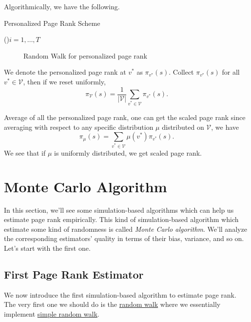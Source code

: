 Algorithmically, we have the following.

\begin{algorithm}[H]\label{algo:personalized-page-rank-scheme}
	\DontPrintSemicolon
	\caption{Personalized Page Rank Scheme}
	\BlankLine

	\For(){\(i = 1, \dots, T\)}{
	}
	\Return{}\;
\end{algorithm}
\begin{figure}[H]
	\centering
	\caption{Random Walk for personalized page rank}
	\label{fig:personalized-pagerank}
\end{figure}

We denote the personalized page rank at \(v^{\ast} \) as \(\pi_{v^{\ast}}(s)\). Collect \(\pi_{v^{\ast}}(s)\) for all \(v^{\ast}\in\mathcal{V}\), then if we reset uniformly,
\[
	\pi_{\mathcal{V}} (s) = \frac{1}{\left\vert \mathcal{V} \right\vert }\sum\limits_{v^{\ast}\in\mathcal{V}} \pi_{v^{\ast}}(s).
\]

\begin{remark}
	Average of all the personalized page rank, one can get the scaled page rank since averaging with respect to any specific distribution \(\mu\) distributed on \(\mathcal{V}\), we have
	\[
		\pi_\mu(s) = \sum\limits_{v^{\ast}\in \mathcal{V}} \mu(v^{\ast})\pi_{v^{\ast}}(s).
	\]
	We see that if \(\mu\) is uniformly distributed, we get scaled page rank.
\end{remark}

\section{Monte Carlo Algorithm}
In this section, we'll see some simulation-based algorithms which can help us estimate page rank empirically. This kind of simulation-based algorithm which estimate some kind of randomness is called \emph{Monte Carlo algorithm}. We'll analyze the corresponding estimators' quality in terms of their bias, variance, and so on. Let's start with the first one.

\subsection{First Page Rank Estimator}
We now introduce the first simulation-based algorithm to estimate page rank. The very first one we should do is the \hyperref[algo:random-walk-algorithm]{random walk} where we essentially implement \hyperref[def:simple-random-walk]{simple random walk}.

